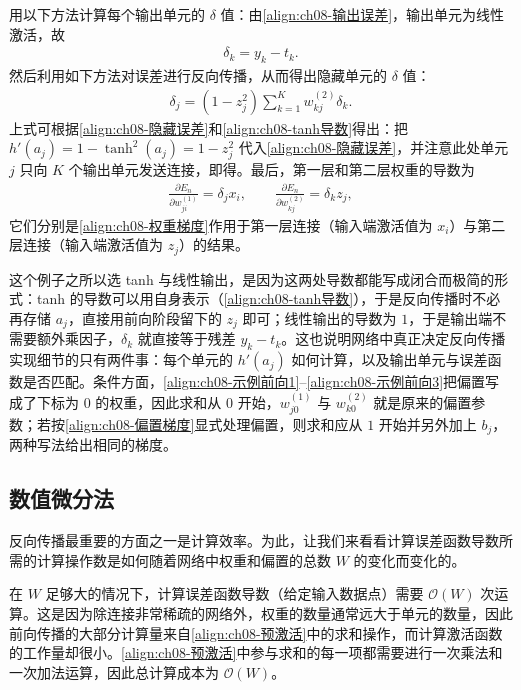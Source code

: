 \documentclass[../../main.tex]{subfiles}
\begin{document}
\begin{solution}
用以下方法计算每个输出单元的 $\delta$ 值：由\eqref{align:ch08-输出误差}，输出单元为线性激活，故
\begin{align*}
\delta_k=y_k-t_k .
\end{align*}
然后利用如下方法对误差进行反向传播，从而得出隐藏单元的 $\delta$ 值：
\begin{align*}
\delta_j=\left(1-z_j^{2}\right)\sum_{k=1}^{K}w_{kj}^{(2)}\delta_k .
\end{align*}
上式可根据\eqref{align:ch08-隐藏误差}和\eqref{align:ch08-tanh导数}得出：把 $h'(a_j)=1-\tanh^{2}(a_j)=1-z_j^{2}$ 代入\eqref{align:ch08-隐藏误差}，并注意此处单元 $j$ 只向 $K$ 个输出单元发送连接，即得。最后，第一层和第二层权重的导数为
\begin{align*}
\frac{\partial E_n}{\partial w_{ji}^{(1)}}=\delta_j x_i,\qquad
\frac{\partial E_n}{\partial w_{kj}^{(2)}}=\delta_k z_j ,
\end{align*}
它们分别是\eqref{align:ch08-权重梯度}作用于第一层连接（输入端激活值为 $x_i$）与第二层连接（输入端激活值为 $z_j$）的结果。
\end{solution}

\begin{remark}
这个例子之所以选 tanh 与线性输出，是因为这两处导数都能写成闭合而极简的形式：tanh 的导数可以用自身表示（\eqref{align:ch08-tanh导数}），于是反向传播时不必再存储 $a_j$，直接用前向阶段留下的 $z_j$ 即可；线性输出的导数为 $1$，于是输出端不需要额外乘因子，$\delta_k$ 就直接等于残差 $y_k-t_k$。这也说明网络中真正决定反向传播实现细节的只有两件事：每个单元的 $h'(a_j)$ 如何计算，以及输出单元与误差函数是否匹配。条件方面，\eqref{align:ch08-示例前向1}--\eqref{align:ch08-示例前向3}把偏置写成了下标为 $0$ 的权重，因此求和从 $0$ 开始，$w_{j0}^{(1)}$ 与 $w_{k0}^{(2)}$ 就是原来的偏置参数；若按\eqref{align:ch08-偏置梯度}显式处理偏置，则求和应从 $1$ 开始并另外加上 $b_j$，两种写法给出相同的梯度。
\end{remark}

\subsection{数值微分法}\label{subsection:ch08-数值微分}

反向传播最重要的方面之一是计算效率。为此，让我们来看看计算误差函数导数所需的计算操作数是如何随着网络中权重和偏置的总数 $W$ 的变化而变化的。

在 $W$ 足够大的情况下，计算误差函数导数（给定输入数据点）需要 $\mathcal{O}(W)$ 次运算。这是因为除连接非常稀疏的网络外，权重的数量通常远大于单元的数量，因此前向传播的大部分计算量来自\eqref{align:ch08-预激活}中的求和操作，而计算激活函数的工作量却很小。\eqref{align:ch08-预激活}中参与求和的每一项都需要进行一次乘法和一次加法运算，因此总计算成本为 $\mathcal{O}(W)$。
\end{document}
